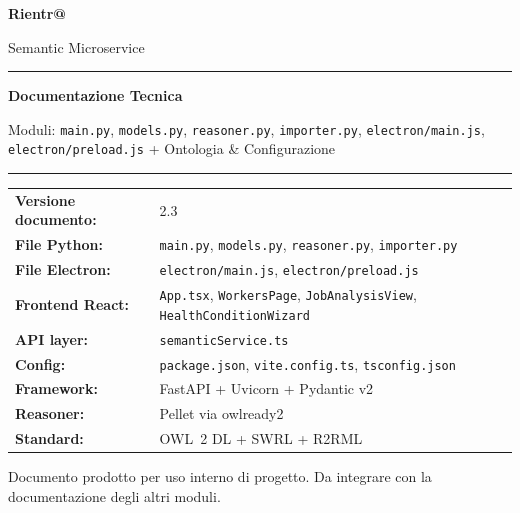 \documentclass[a4paper,12pt]{article}
\begin{document}
\begin{titlepage}
  \centering
  \vspace*{2cm}
  {\Huge\bfseries\textcolor{rientraBlue}{Rientr@}\par}
  \vspace{0.4cm}
  {\Large Semantic Microservice\par}
  \vspace{1cm}
  \rule{\linewidth}{1pt}\par
  \vspace{0.5cm}
  {\LARGE\bfseries Documentazione Tecnica\par}
  \vspace{0.3cm}
  {\large Moduli: \texttt{main.py}, \texttt{models.py}, \texttt{reasoner.py}, \texttt{importer.py},
  \texttt{electron/\allowbreak main.js}, \texttt{electron/\allowbreak preload.js} + Ontologia \& Configurazione\par}
  \vspace{0.5cm}
  \rule{\linewidth}{1pt}\par
  \vspace{2cm}
  \renewcommand{\arraystretch}{1.5}
  \begin{tabular}{>{\bfseries}p{3.8cm} p{8cm}}
    Versione documento: & 2.3 \\
    File Python:        & \texttt{main.py}, \texttt{models.py},
                          \texttt{reasoner.py}, \texttt{importer.py} \\
    File Electron:      & \texttt{electron/main.js},
                          \texttt{electron/preload.js} \\
    Frontend React:     & \texttt{App.tsx}, \texttt{WorkersPage},
                          \texttt{JobAnalysisView},
                          \texttt{HealthConditionWizard} \\
    API layer:          & \texttt{semanticService.ts} \\
    Config:             & \texttt{package.json}, \texttt{vite.config.ts},
                          \texttt{tsconfig.json} \\
    Framework:          & FastAPI + Uvicorn + Pydantic v2 \\
    Reasoner:           & Pellet via owlready2 \\
    Standard:           & OWL~2 DL + SWRL + R2RML \\
  \end{tabular}
  \renewcommand{\arraystretch}{1}
  \vfill
  {\small\textcolor{rientraGray}{Documento prodotto per uso interno di progetto.
  Da integrare con la documentazione degli altri moduli.}\par}
\end{titlepage}
\end{document}
